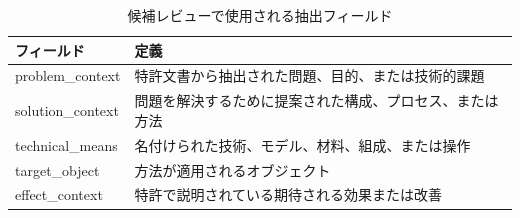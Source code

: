 \begin{table}[tbp]
\centering
\small
\caption{候補レビューで使用される抽出フィールド}
\label{tab:extraction\_fields}
\begin{tabular}{ll}
\toprule
フィールド & 定義 \\
\midrule
problem\_context & 特許文書から抽出された問題、目的、または技術的課題 \\
solution\_context & 問題を解決するために提案された構成、プロセス、または方法 \\
technical\_means & 名付けられた技術、モデル、材料、組成、または操作 \\
target\_object & 方法が適用されるオブジェクト \\
effect\_context & 特許で説明されている期待される効果または改善 \\
\bottomrule
\end{tabular}
\end{table}
